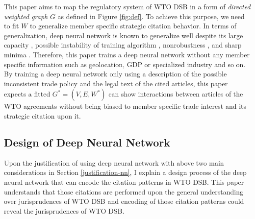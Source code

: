 \documentclass[12pt,letterpaper]{article}
\begin{document}
This paper aims to map the regulatory system of WTO DSB in a form of \textit{directed weighted graph} $G$ as defined in Figure \ref{fig:def}.
To achieve this purpose, we need to fit $W$ to generalize member specific strategic citation behavior.
In terms of generalization, deep neural network is known to generalize well despite
its large capacity \citep{neyshabur2017exploring}, possible instability of training algorithm \citep{charles2017stability}, nonrobustness \citep{zahavy2017ensemble}, and sharp minima \citep{dinh2017sharp}.
Therefore, this paper trains a deep neural network without any member specific information such as geolocation, GDP or specialized industry and so on. %
By training a deep neural network only using a description of the possible inconsistent trade policy and the legal text of the cited articles,
this paper expects a fitted $G^{*} = (V, E, W^*)$ can show interactions between articles of the WTO agreements
without being biased to member specific trade interest and its strategic citation upon it.

\subsection{Design of Deep Neural Network}\label{subsec:design:dnn}
Upon the justification of using deep neural network with above two main considerations in Section \ref{justification-nn}, %
I explain a design process of the deep neural network that can encode the citation patterns in WTO DSB.
This paper understands that those citations are performed upon the general understanding over jurisprudences of WTO DSB and encoding of
those citation patterns could reveal the jurisprudences of WTO DSB.
 





\end{document}
